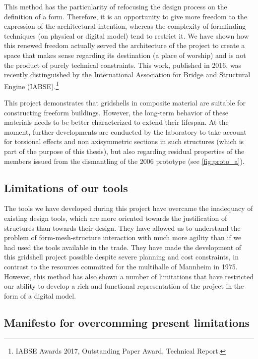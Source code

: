 This method has the particularity of refocusing the design process on the definition of a form. Therefore, it is an opportunity to give more freedom to the expression of the architectural intention, whereas the complexity of formfinding techniques (on physical or digital model) tend to restrict it. We have shown how this renewed freedom actually served the architecture of the project to create a space that makes sense regarding its destination (a place of worship) and is not the product of purely technical constraints. This work, published in 2016, was recently distinguished by the International Association for Bridge and Structural Engine (IABSE).\footnote {IABSE Awards 2017, Outstanding Paper Award, Technical Report.}

This project demonstrates that gridshells in composite material are suitable for constructing freeform buildings. However, the long-term behavior of these materials needs to be better characterized to extend their lifespan. At the moment, further developments are conducted by the laboratory to take account for torsional effects and non axisymmetric sections in such structures (which is part of the purpose of this thesis), but also regarding residual properties of the members issued from the dismantling of the 2006 prototype \cite{Douthe2017} (see \cref{fig:proto_a}).

\subsection*{Limitations of our tools}

The tools we have developed during this project have overcame the inadequacy of existing design tools, which are more oriented towards the justification of structures than towards their design. They have allowed us to understand the problem of form-mesh-structure interaction with much more agility than if we had used the tools available in the trade. They have made the development of this gridshell project possible despite severe planning and cost constraints, in contrast to the resources committed for the multihalle of Mannheim in 1975. However, this method has also shown a number of limitations that have restricted our ability to develop a rich and functional representation of the project in the form of a digital model.

\subsection*{Manifesto for overcomming present limitations}

